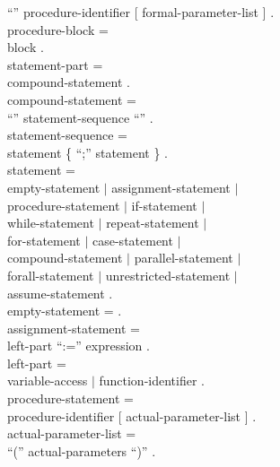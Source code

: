 \begin{grammar}
    {\GB}``{\Procedure}'' procedure-identifier
           [ formal-parameter-list ] .                    \\
  {\GA}procedure-block =                                  \\
    {\GB}block .                                          \\
  {\GA}statement-part =                                   \\
    {\GB}compound-statement .                             \\
  {\GA}compound-statement =                               \\
    {\GB}``{\Begin}'' statement-sequence ``{\End}'' .     \\
  {\GA}statement-sequence =                               \\
    {\GB}statement \{ ``;'' statement \} .                \\
  {\GA}statement =                                        \\
    {\GB}empty-statement $|$ assignment-statement $|$     \\
    {\GB}procedure-statement $|$ if-statement $|$         \\
    {\GB}while-statement $|$ repeat-statement $|$         \\
    {\GB}for-statement $|$ case-statement $|$             \\
    {\GB}compound-statement $|$ parallel-statement $|$    \\
    {\GB}forall-statement $|$ unrestricted-statement $|$  \\
    {\GB}assume-statement .                               \\
  {\GA}empty-statement = .                                \\
  {\GA}assignment-statement =                             \\
    {\GB}left-part ``:='' expression .                    \\
  {\GA}left-part =                                        \\
    {\GB}variable-access $|$ function-identifier .        \\
  {\GA}procedure-statement =                              \\
    {\GB}procedure-identifier [ actual-parameter-list ] . \\
  {\GA}actual-parameter-list =                            \\
    {\GB}``('' actual-parameters ``)'' .                  \\

\end{grammar}
